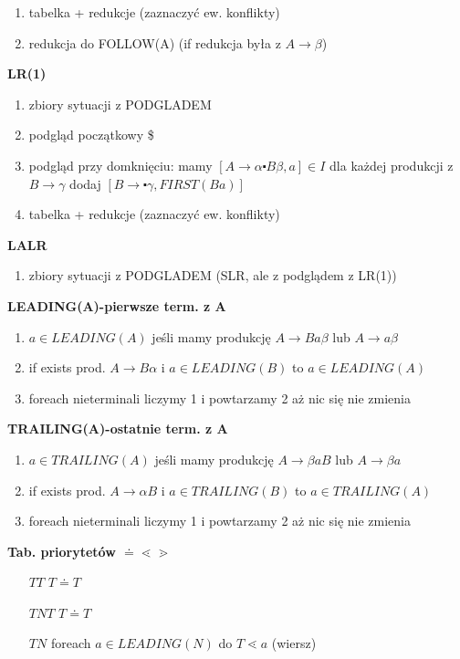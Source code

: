 \begin{multicols}{3}
\begin{enumerate}
      \item tabelka + redukcje (zaznaczyć ew. konflikty)
      \item redukcja do FOLLOW(A) (if redukcja była z $A\rightarrow \beta$)
    \end{enumerate}
    \textbf{LR(1)}
    \begin{enumerate}
      \item zbiory sytuacji z PODGLADEM
      \item podgląd początkowy \$
      \item podgląd przy domknięciu: mamy $[A\rightarrow \alpha \centerdot B \beta , a] \in I$ 
          dla każdej produkcji z $B\rightarrow \gamma$ dodaj 
          $[B\rightarrow \centerdot \gamma ,FIRST(Ba)]$
      \item tabelka + redukcje (zaznaczyć ew. konflikty)
    \end{enumerate}	
    \textbf{LALR}
    \begin{enumerate}
      \item zbiory sytuacji z PODGLADEM (SLR, ale z podglądem z LR(1))
    \end{enumerate}	
    \textbf{LEADING(A)-pierwsze term. z A}
    \begin{enumerate}
      \item	$a \in LEADING(A)$ jeśli mamy produkcję $A\rightarrow Ba\beta$ lub $A \rightarrow a \beta$ 
      \item if exists prod. $A\rightarrow B\alpha$ i $a \in LEADING(B)$ to $a \in LEADING(A)$
      \item foreach nieterminali liczymy 1 i powtarzamy 2 aż nic się nie zmienia
    \end{enumerate}
    \textbf{TRAILING(A)-ostatnie term. z A}
    \begin{enumerate}
      \item	$a \in TRAILING(A)$ jeśli mamy produkcję $A\rightarrow \beta aB$ lub $A \rightarrow \beta a$ 
      \item if exists prod. $A\rightarrow \alpha B$ i $a \in TRAILING(B)$ to $a \in TRAILING(A)$
      \item foreach nieterminali liczymy 1 i powtarzamy 2 aż nic się nie zmienia
    \end{enumerate}
    \textbf{Tab. priorytetów $\doteq \lessdot \gtrdot $}
    \begin{enumerate}
      \item [$TT$] $T \doteq T$
      \item [$TNT$] $T \doteq T$
      \item [$TN$] foreach $a \in LEADING(N)$ do $T \lessdot a$ (wiersz)

\end{enumerate}
\end{multicols}

